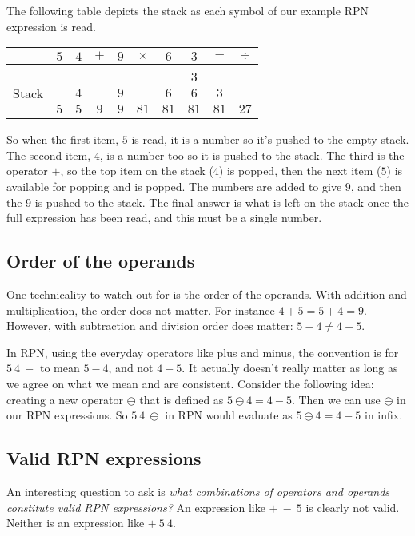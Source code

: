 \documentclass[twocolumn]{iagproc}
\begin{document}
The following table depicts the stack as each symbol of our example RPN expression is read.
\begin{center}
  \begin{tabular}[b]{lccccccccc}
    \toprule
    & $5$ & $4$ & $+$ & $9$ & $\times$ & $6$  & $3$  & $-$  & $\div$ \\
    \midrule \\
    \multirow{3}{6mm}[-2mm]{\begin{sideways}Stack\end{sideways}}
    & $ $ & $ $ & $ $ & $ $ &     $ $  & $ $  & $3$  & $ $  & $ $    \\
    & $ $ & $4$ & $ $ & $9$ &     $ $  & $6$  & $6$  & $3$  & $ $    \\
    & $5$ & $5$ & $9$ & $9$ &     $81$ & $81$ & $81$ & $81$ & $27$    \\
    \bottomrule
  \end{tabular}
\end{center}
So when the first item, $5$ is read, it is a number so it's pushed to the empty stack.
The second item, $4$, is a number too so it is pushed to the stack.
The third is the operator $+$, so the top item on the stack ($4$) is popped, then the next item ($5$) is available for popping and is popped.
The numbers are added to give $9$, and then the $9$ is pushed to the stack.
The final answer is what is left on the stack once the full expression has been read, and this must be a single number.

\subsection*{Order of the operands}
One technicality to watch out for is the order of the operands.
With addition and multiplication, the order does not matter.
For instance $4+5=5+4=9$.
However, with subtraction and division order does matter: $5-4 \neq 4-5$.

In RPN, using the everyday operators like plus and minus, the convention is for $5 \ 4 \ -$ to mean $5-4$, and not $4-5$.
It actually doesn't really matter as long as we agree on what we mean and are consistent.
Consider the following idea: creating a new operator $\ominus$ that is defined as $5 \ominus 4 = 4 - 5$.
Then we can use $\ominus$ in our RPN expressions.
So $5 \ 4 \ \ominus$ in RPN would evaluate as $5 \ominus 4 = 4 - 5$ in infix.

\subsection*{Valid RPN expressions}
An interesting question to ask is \emph{what combinations of operators and operands constitute valid RPN expressions?}
An expression like $+ \ - \ 5$ is clearly not valid.
Neither is an expression like $+ \ 5 \ 4$.
\end{document}
